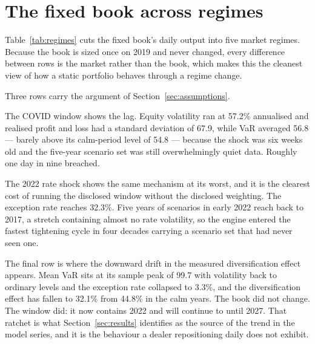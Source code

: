 
\section{The fixed book across regimes}\label{sec:appendix_c}

Table~\ref{tab:regimes} cuts the fixed book's daily output into five market
regimes. Because the book is sized once on 2019 and never changed, every
difference between rows is the market rather than the book, which makes this
the cleanest view of how a static portfolio behaves through a regime change.



Three rows carry the argument of Section~\ref{sec:assumptions}.

The COVID window shows the lag. Equity volatility ran at 57.2\% annualised and
realised profit and loss had a standard deviation of 67.9, while VaR averaged
56.8 --- barely above its calm-period level of 54.8 --- because the shock was
six weeks old and the five-year scenario set was still overwhelmingly quiet
data. Roughly one day in nine breached.

The 2022 rate shock shows the same mechanism at its worst, and it is the
clearest cost of running the disclosed window without the disclosed weighting.
The exception rate reaches 32.3\%. Five years of scenarios in early 2022 reach
back to 2017, a stretch containing almost no rate volatility, so the engine
entered the fastest tightening cycle in four decades carrying a scenario set
that had never seen one.

The final row is where the downward drift in the measured diversification
effect appears. Mean VaR sits at its sample peak of 99.7 with volatility back
to ordinary levels and the exception rate collapsed to 3.3\%, and the
diversification effect has fallen to 32.1\% from 44.8\% in the calm years. The
book did not change. The window did: it now contains 2022 and will continue to
until 2027. That ratchet is what Section~\ref{sec:results} identifies as the
source of the trend in the model series, and it is the behaviour a dealer
repositioning daily does not exhibit.
